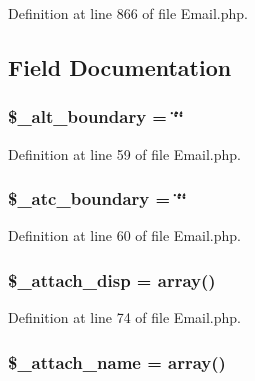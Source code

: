 Definition at line 866 of file Email.\-php.



\subsection{Field Documentation}
\hypertarget{class_c_i___email_a477272b452ccbf6729c9c804cd35b902}{
\subsubsection[{\$\-\_\-alt\-\_\-boundary}]{\setlength{\rightskip}{0pt plus 5cm}\$\-\_\-alt\-\_\-boundary = \char`\"{}\char`\"{}}}\label{class_c_i___email_a477272b452ccbf6729c9c804cd35b902}


Definition at line 59 of file Email.\-php.

\hypertarget{class_c_i___email_a643faf39316959087e82595b6355f0a0}{
\subsubsection[{\$\-\_\-atc\-\_\-boundary}]{\setlength{\rightskip}{0pt plus 5cm}\$\-\_\-atc\-\_\-boundary = \char`\"{}\char`\"{}}}\label{class_c_i___email_a643faf39316959087e82595b6355f0a0}


Definition at line 60 of file Email.\-php.

\hypertarget{class_c_i___email_addbe468b29817a8cd1484d136b8b29e3}{
\subsubsection[{\$\-\_\-attach\-\_\-disp}]{\setlength{\rightskip}{0pt plus 5cm}\$\-\_\-attach\-\_\-disp = array()}}\label{class_c_i___email_addbe468b29817a8cd1484d136b8b29e3}


Definition at line 74 of file Email.\-php.

\hypertarget{class_c_i___email_a4ce64db2018a92c0ba67265315185f51}{
\subsubsection[{\$\-\_\-attach\-\_\-name}]{\setlength{\rightskip}{0pt plus 5cm}\$\-\_\-attach\-\_\-name = array()}}\label{class_c_i___email_a4ce64db2018a92c0ba67265315185f51}


